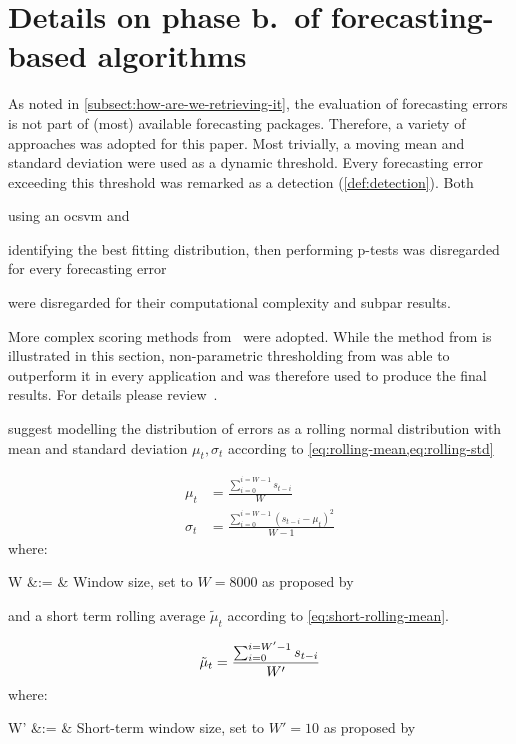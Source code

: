 \section{Details on phase b.\ of forecasting-based algorithms}\label{sec:forecasting-eval}
As noted in \cref{subsect:how-are-we-retrieving-it}, the evaluation of forecasting
errors is not part of (most) available forecasting packages. Therefore, a variety
of approaches was adopted for this paper. Most trivially, a moving mean and standard
deviation were used as a dynamic threshold. Every forecasting error exceeding this
threshold was remarked as a detection (\cref{def:detection}). Both 
\begin{enumerate*}
    \item using an \gls{ocsvm} and 
    \item identifying the best fitting distribution, then performing p-tests was
    disregarded for every forecasting error
\end{enumerate*}
were disregarded for their computational complexity and subpar results.

More complex scoring methods from~\cite{Ahmad.2017,Hundman.2018} were adopted.
While the method from \textcite{Ahmad.2017} is illustrated in this section,
non-parametric thresholding from \textcite{Hundman.2018} was able to outperform
it in every application and was therefore used to produce the final results.
For details please review~\cite{Hundman.2018}.

\textcite{Ahmad.2017} suggest modelling the distribution of errors as a rolling normal
distribution with mean and standard deviation \(\mu_t, \sigma_t\) according to
\cref{eq:rolling-mean,eq:rolling-std}

\begin{align}
    \mu_t&= \frac{\sum_{i=0}^{i=W-1}s_{t-i}}{W}\label{eq:rolling-mean}\\
    \sigma_t &= \frac{\sum_{i=0}^{i=W-1}{(s_{t-i}-\mu_t)}^2}{W - 1}\label{eq:rolling-std}
\end{align}
where:
\begin{conditions}
    W &:= & Window size, set to \(W=8000\) as proposed by~\cite{Ahmad.2017}
\end{conditions}

and a short term rolling average \(\tilde{\mu}_t\) according to \cref{eq:short-rolling-mean}.

\begin{equation}
    \tilde{\mu}_t = \frac{\sum_{i=0}^{i=W'-1}s_{t-i}}{W'}\label{eq:short-rolling-mean}\\
\end{equation}
where:
\begin{conditions}
    W' &:= & Short-term window size, set to \(W'=10\) as proposed by~\cite{Ahmad.2017}
\end{conditions}

